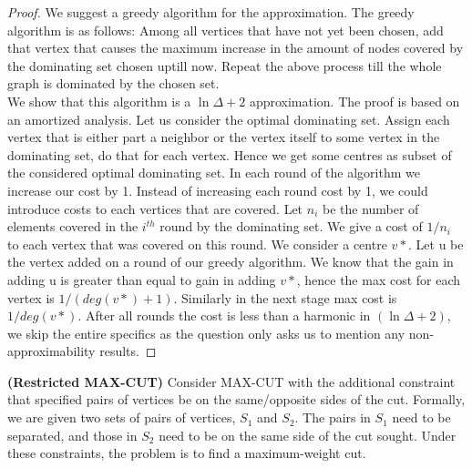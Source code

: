 \documentclass[solution,addpoints,12pt]{exam}
\begin{document}
\begin{questions}
\begin{parts}
\begin{solution}
\begin{proof}
We suggest a greedy algorithm for the approximation. The greedy algorithm is as follows: Among all vertices that have not yet been chosen, add that vertex that causes the maximum increase in the amount of nodes covered by the dominating set chosen uptill now. Repeat the above process till the whole graph is dominated by the chosen set.
\\
We show that this algorithm is a $\ln \Delta + 2$ approximation. The proof is based on an amortized analysis. Let us consider the optimal dominating set. Assign each vertex that is either part a neighbor or the vertex itself to some vertex in the dominating set, do that for each vertex. Hence we get some centres as subset of the considered optimal dominating set. In each round of the algorithm we increase our cost by 1. Instead of increasing each round cost by 1, we could introduce costs to each vertices that are covered. Let $n_i$ be the number of elements covered in the $i^{th}$ round by the dominating set. We give a cost of $1/n_i$ to each vertex that was covered on this round. We consider a centre $v*$. Let u be the vertex added on a round of our greedy algorithm. We know that the gain in adding u is greater than equal to gain in adding $v*$, hence the max cost for each vertex is $1/(deg(v*)+1)$. Similarly in the next stage max cost is $1/deg(v*)$. After all rounds the cost is less than a harmonic in $(\ln \Delta + 2)$, we skip the entire specifics as the question only asks us to mention any non-approximability results.
\end{proof}
  \end{solution}
\end{parts}

\question[30] \textbf{(Restricted MAX-CUT)}
 Consider MAX-CUT with the additional constraint that specified pairs
  of vertices be on the same/opposite sides of the cut. Formally, we
  are given two sets of pairs of vertices, $S_1$ and $S_2$. The pairs
  in $S_1$ need to be separated, and those in $S_2$ need to be on the
  same side of the cut sought. Under these constraints, the problem is
  to find a maximum-weight cut.
\begin{parts}

\end{parts}
\end{questions}
\end{document}
